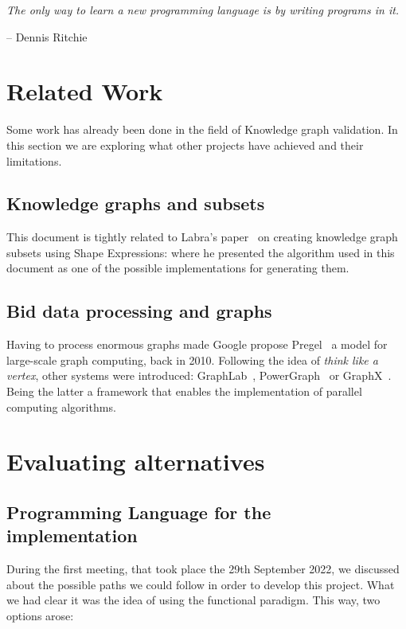 \epigraph{\textit{The only way to learn a new programming language is by writing programs in it.}}{-- \textup{Dennis Ritchie}}

\section{Related Work}

Some work has already been done in the field of Knowledge graph validation. In this section we are exploring what other projects have achieved and their limitations.

\subsection{Knowledge graphs and subsets}

This document is tightly related to Labra's paper~\cite{https://doi.org/10.48550/arxiv.2110.11709} on creating knowledge graph subsets using Shape Expressions: where he presented the algorithm used in this document as one of the possible implementations for generating them.

\subsection{Bid data processing and graphs}

Having to process enormous graphs made Google propose Pregel~\cite{10.1145/1807167.1807184} a model for large-scale graph computing, back in 2010. Following the idea of \textit{think like a vertex}, other systems were introduced: GraphLab~\cite{10.14778/2212351.2212354}, PowerGraph~\cite{180251} or GraphX~\cite{186216}. Being the latter a framework that enables the implementation of parallel computing algorithms.

\section{Evaluating alternatives}

\subsection{Programming Language for the implementation}

During the first meeting, that took place the 29th September 2022, we discussed about the possible paths we could follow in order to develop this project. What we had clear it was the idea of using the functional paradigm. This way, two options arose:

